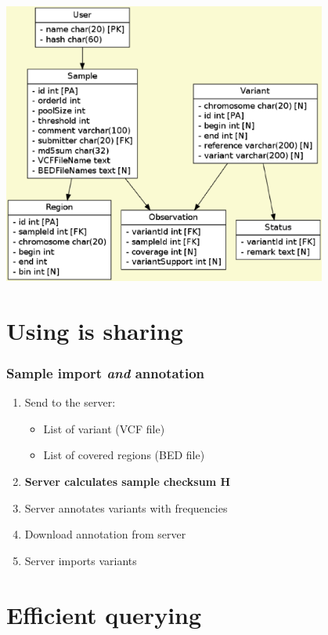 \documentclass[slidestop]{beamer}
\begin{document}
\begin{frame}
  \begin{center}
    \includegraphics[width=0.8\textwidth]{schema}
  \end{center}
\end{frame}

\section{Using is sharing}

\begin{frame}
  \frametitle{Sample import {\em and} annotation}
  \begin{enumerate}
    \item<1-> Send to the server:
      \begin{itemize}
        \item List of variant (VCF file)
        \item List of covered regions (BED file)
      \end{itemize}
    \item<5-> {\bf Server calculates sample checksum H}
    \item<2-> Server annotates variants with frequencies 
    \item<3-> Download annotation from server
    \item<4-> Server imports variants 
  \end{enumerate}
\end{frame}

\section{Efficient querying}
\end{document}
